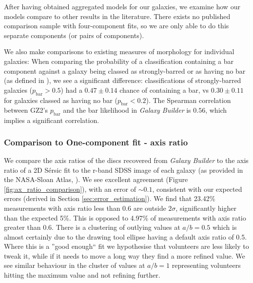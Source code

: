 \documentclass[../main.tex]{subfiles}
\begin{document}
After having obtained aggregated models for our galaxies, we examine how our models compare to other results in the literature. There exists no published comparison sample with four-component fits, so we are only able to do this separate components (or pairs of components).

We also make comparisons to existing measures of morphology for individual galaxies: When comparing the probability of a classification containing a bar component against a galaxy being classed as strongly-barred or as having no bar (as defined in \citealt{Masters2010:1003.0449v2}), we see a significant difference: classifications of strongly-barred galaxies ($p_\text{bar} > 0.5$) had a $0.47 \pm 0.14$ chance of containing a bar, vs $0.30 \pm 0.11$ for galaxies classed as having no bar ($p_\text{bar} < 0.2$). The Spearman correlation between GZ2's $p_\text{bar}$ and the bar likelihood in \textit{Galaxy Builder} is $0.56$, which implies a significant correlation.

\subsubsection{Comparison to One-component fit - axis ratio}
We compare the axis ratios of the discs recovered from \textit{Galaxy Builder} to the axis ratio of a 2D S\'ersic fit to the r-band SDSS image of each galaxy (as provided in the NASA-Sloan Atlas, \citealt{2011AJ....142...31B}).
We see excellent agreement (Figure \ref{fig:ax_ratio_comparison}), with an error of $\sim0.1$, consistent with our expected errors (derived in Section \ref{sec:error_estimation}). We find that 23.42\% measurements with axis ratio less than 0.6 are outside $2\sigma$, significantly higher than the expected 5\%. This is opposed to 4.97\% of measurements with axis ratio greater than 0.6. There is a clustering of outlying values at $a/b=0.5$ which is almost certainly due to the drawing tool ellipse having a default axis ratio of 0.5. Where this is a ''good enough`` fit we hypothesise that volunteers are less likely to tweak it, while if it needs to move a long way they find a more refined value. We see similar behaviour in the cluster of values at $a/b=1$ representing volunteers hitting the maximum value and not refining further.
\end{document}

